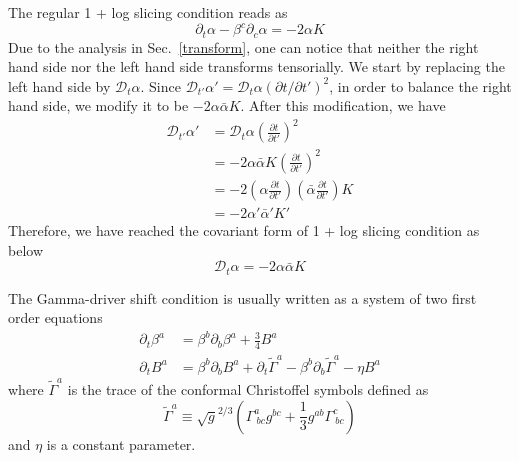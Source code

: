 \documentclass[letterpaper,nofootinbib,prd,amsmath,onecolumn]{revtex4-1}
\begin{document}
The regular 1 + log slicing condition reads as
\begin{equation}\label{1 + log slicing}
\partial_{t}\alpha - \beta^{c}\partial_{c}\alpha = -2\alpha K
\end{equation}
Due to the analysis in Sec.~\ref{transform}, one can notice that neither the right hand side nor the left hand side transforms tensorially. We start by replacing the left hand side by $\mathscr{D}_{t}\alpha$. Since $\mathscr{D}_{t'}\alpha' = \mathscr{D}_{t}\alpha\left(\partial t/\partial t'\right)^{2}$, in order to balance the right hand side, we modify it to be $-2\alpha {\bar \alpha}K$. After this modification, we have
\begin{align*}
\mathscr{D}_{t'}\alpha' & = \mathscr{D}_{t}\alpha\left(\frac{\partial t}{\partial t'}\right)^{2}\\
& = -2\alpha{\bar \alpha}K\left(\frac{\partial t}{\partial t'}\right)^{2}\\
& = -2\left(\alpha\frac{\partial t}{\partial t'}\right)\left({\bar \alpha}\frac{\partial t}{\partial t'}\right)K\\
& = -2\alpha'{\bar \alpha}'K'
\end{align*}
Therefore, we have reached the covariant form of 1 + log slicing condition as below
\begin{equation}\label{covariant 1 + log slicing}
\mathscr{D}_{t}\alpha = -2\alpha{\bar \alpha}K
\end{equation}

The Gamma-driver shift condition is usually written as a system of two first order equations
\begin{subequations}\label{Gamma-driver shift set}
\begin{align}
\partial_{t}\beta^{a} & = \beta^{b}\partial_{b}\beta^{a} + \frac{3}{4}B^{a}\\
\partial_{t}B^{a} & = \beta^{b}\partial_{b}B^{a} + \partial_{t}{\tilde \Gamma}^{a} - \beta^{b}\partial_{b}{\tilde \Gamma}^{a} - \eta B^{a}
\end{align}
\end{subequations}
where ${\tilde \Gamma}^{a}$ is the trace of the conformal Christoffel symbols defined as
\begin{equation}
{\tilde \Gamma}^{a} \equiv \sqrt{g}^{2/3}\left(\Gamma^{a}_{~bc}g^{bc} + \frac{1}{3}g^{ab}\Gamma^{c}_{~bc}\right)
\end{equation}
and $\eta$ is a constant parameter. 
\end{document}
